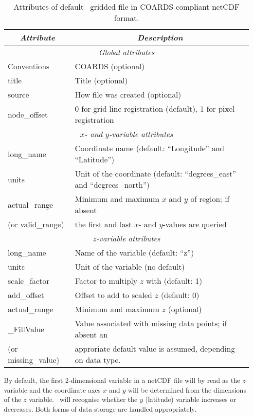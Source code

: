 \begin{table}
\centering
\begin{tabular}{|l|l|} \hline
\multicolumn{1}{|c}{\emph{Attribute}}   &       \multicolumn{1}{|c|}{\emph{Description}}        \\ \hline
\multicolumn{2}{|c|}{\emph{Global attributes}} \\ \hline
Conventions			& COARDS (optional) \\ \hline
title				& Title (optional) \\ \hline
source				& How file was created (optional) \\ \hline
node\_offset			& 0 for grid line registration (default), 1 for pixel registration \\ \hline
\multicolumn{2}{|c|}{\emph{$x$- and $y$-variable attributes}} \\ \hline
long\_name			& Coordinate name (default: ``Longitude'' and ``Latitude'') \\ \hline
units				& Unit of the coordinate (default: ``degrees\_east'' and ``degrees\_north'') \\ \hline
actual\_range			& Minimum and maximum $x$ and $y$ of region; if absent \\
(or valid\_range)		& the first and last $x$- and $y$-values are queried \\ \hline
\multicolumn{2}{|c|}{\emph{$z$-variable attributes}} \\ \hline
long\_name			& Name of the variable (default: ``z'') \\ \hline
units				& Unit of the variable (no default) \\ \hline
scale\_factor			& Factor to multiply $z$ with (default: 1) \\ \hline
add\_offset			& Offset to add to scaled $z$ (default: 0) \\ \hline
actual\_range			& Minimum and maximum $z$ (optional) \\ \hline
\_FillValue			& Value associated with missing data points; if absent an\\
(or missing\_value)		& approriate default value is assumed, depending on data type. \\ \hline
\end{tabular} 
\caption{Attributes of default \gmt\ gridded file in COARDS-compliant netCDF format.}
\label{tbl:netcdf-format}
\end{table}

By default, the first 2-dimensional variable in a netCDF file will by read as the $z$ variable
and the coordinate axes $x$ and $y$ will be determined from the dimensions of the $z$ variable.
\GMT\ will recognise whether the $y$ (latitude) variable increases or decreases. Both forms of
data storage are handled appropriately.

